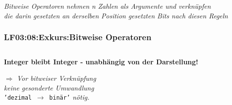\begin{frame}[fragile]
\begin{small}
\begin{center}
\begin{tabular}{c|c|c|c|}
\end{tabular}
    \end{center}
  \end{small}
  
  \vspace{0.5cm}
\begin{footnotesize}
    \begin{flushright}
      \textit{Bitweise Operatoren nehmen n Zahlen als Argumente und verknüpfen \\
      die darin gesetzten an derselben Position gesetzten Bits nach diesen Regeln}
    \end{flushright}
  \end{footnotesize}

\end{frame}

\begin{frame}[fragile]  
  \frametitle{LF03:08:Exkurs:Bitweise Operatoren}

    \begin{center}
    \begin{minipage}{0.9\textwidth}

      \inputminted[fontsize=\footnotesize,linenos]{python}{\snpLf/dm-0308-int-remains-int.py}
 
    \end{minipage}
    \end{center}


  \vspace{0.6cm}
  \begin{flushright}
    \begin{footnotesize}
      \textrm{\textbf{Integer bleibt Integer - unabhängig von der Darstellung!}}
      
      \vspace{0.3cm}
      \textrm{\textit{$\Rightarrow$ Vor bitweiser Verknüpfung}}\\
      \textrm{\textit{keine gesonderte Umwandlung}}\\
      \texttt{'dezimal $\rightarrow$ binär'} \textrm{\textit{nötig.}}\\
    \end{footnotesize}
  \end{flushright}
\end{frame}

